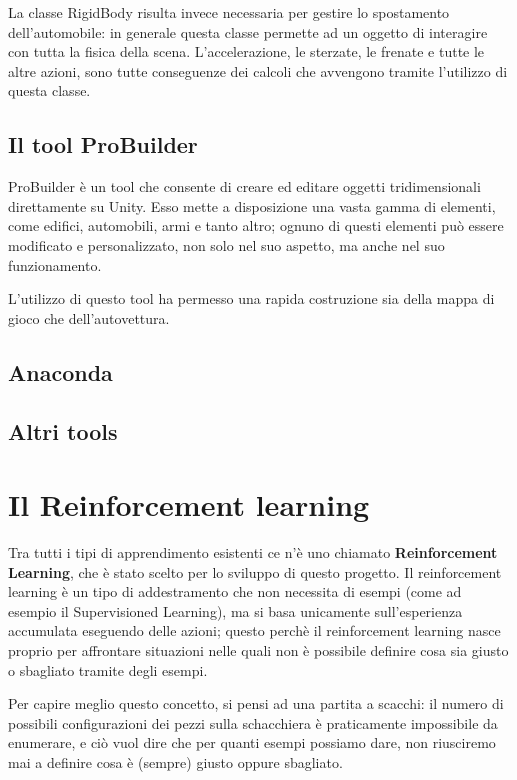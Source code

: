 \documentclass[a4paper,11pt,twoside]{report} %
\begin{document}
La classe RigidBody risulta invece necessaria per gestire lo spostamento dell'automobile: in generale questa classe permette ad un oggetto di interagire con tutta la fisica della scena. L'accelerazione, le sterzate, le frenate e tutte le altre azioni, sono tutte conseguenze dei calcoli che avvengono tramite l'utilizzo di questa classe.

\section{Il tool ProBuilder}

ProBuilder è un tool che consente di creare ed editare oggetti tridimensionali direttamente su Unity. Esso mette a disposizione una vasta gamma di elementi, come edifici, automobili, armi e tanto altro; ognuno di questi elementi può essere modificato e personalizzato, non solo nel suo aspetto, ma anche nel suo funzionamento.

L'utilizzo di questo tool ha permesso una rapida costruzione sia della mappa di gioco che dell'autovettura.

\section{Anaconda}

\section{Altri tools}


\chapter{Il Reinforcement learning}

Tra tutti i tipi di apprendimento esistenti ce n'è uno chiamato \textbf{Reinforcement Learning}, che è stato scelto per lo sviluppo di questo progetto. Il reinforcement learning è un tipo di addestramento che non necessita di esempi (come ad esempio il Supervisioned Learning), ma si basa unicamente sull'esperienza accumulata eseguendo delle azioni; questo perchè il reinforcement learning nasce proprio per affrontare situazioni nelle quali non è possibile definire cosa sia giusto o sbagliato tramite degli esempi.

Per capire meglio questo concetto, si pensi ad una partita a scacchi: il numero di possibili configurazioni dei pezzi sulla schacchiera è praticamente impossibile da enumerare, e ciò vuol dire che per quanti esempi possiamo dare, non riusciremo mai a definire cosa è (sempre) giusto oppure sbagliato. 
\end{document}
